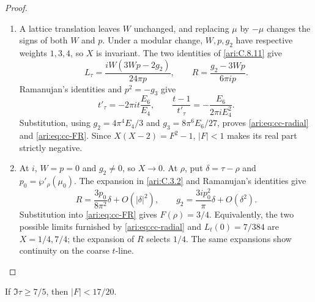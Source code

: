 \begin{proof}
\begin{enumerate}[label=\arabic*.,leftmargin=*]
\item A lattice translation leaves $W$ unchanged, and replacing $\mu$
by $-\mu$ changes the signs of both $W$ and $p$. Under a modular
change, $W,p,g_2$ have respective weights $1,3,4$, so $X$ is
invariant. The two identities of \ref{ari:C.8.11} give
\[
 L_\tau=\frac{iW(3Wp-2g_2)}{24\pi p},\qquad
 R=\frac{g_2-3Wp}{6\pi ip}.
\]
Ramanujan's identities and $p^2=-g_3$ give
\[
 t'_\tau=-2\pi it\frac{E_6}{E_4},\qquad
 \frac{t-1}{t'_\tau}=-\frac{E_6}{2\pi iE_4^2}.
\]
Substitution, using $g_2=4\pi^4E_4/3$ and
$g_3=8\pi^6E_6/27$, proves \eqref{ari:eq:cc-radial} and
\eqref{ari:eq:cc-FR}. Since $X(X-2)=F^2-1$, $|F|<1$ makes
its real part strictly negative.

\item At $i$, $W=p=0$ and $g_2\ne0$, so $X\to0$. At $\rho$, put $\delta=\tau-\rho$ and $p_0=\wp'_\rho(\mu_0)$.
The expansion in \ref{ari:C.3.2} and Ramanujan's identities give
\[
 R=\frac{3p_0}{8\pi^2}\delta+O(|\delta|^2),\qquad
 g_2=\frac{3ip_0^2}{\pi}\delta+O(\delta^2).
\]
Substitution into \eqref{ari:eq:cc-FR} gives $F(\rho)=3/4$.
Equivalently, the two possible limits furnished by
\eqref{ari:eq:cc-radial} and $L_t(0)=7/384$ are $X=1/4,7/4$;
the expansion of $R$ selects $1/4$. The same expansions show
continuity on the coarse $t$-line.
\end{enumerate}
\end{proof}

\begin{proposition}\hypertarget{tag-001N}{}\label{ari:C.8.13}

If $\Im\tau\ge7/5$, then $|F|<17/20$.
\end{proposition}


